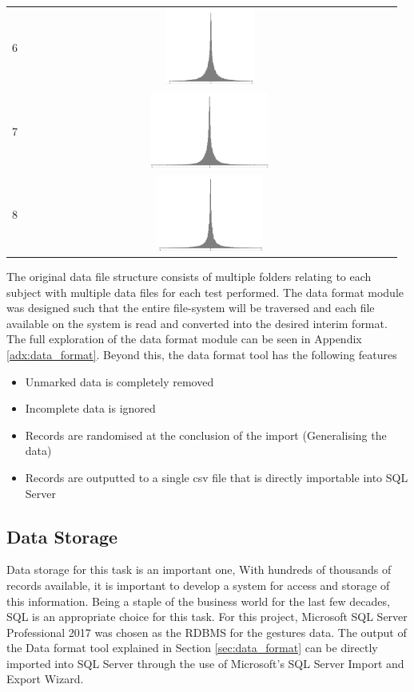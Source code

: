 \documentclass[11pt]{article}
\begin{document}
\begin{table}[H]
\begin{tabular}{cc}
			6 & \includegraphics[height=2.5cm, width=12cm]{Figures/Stats/channel6}\\
			7 & \includegraphics[height=2.5cm, width=12cm]{Figures/Stats/channel7}\\
			8 & \includegraphics[height=2.5cm, width=12cm]{Figures/Stats/channel8}\\
			\bottomrule
		\end{tabular}
	\end{table}

	\noindent
	The original data file structure consists of multiple folders relating to each subject with multiple data files for each test performed. The data format module was designed such that the entire file-system will be traversed and each file available on the system is read and converted into the desired interim format. The full exploration of the data format module can be seen in Appendix  \ref{adx:data_format}. Beyond this, the data format tool has the following features
	
	\begin{itemize}
		\item Unmarked data is completely removed
		\item Incomplete data is ignored
		\item Records are randomised at the conclusion of the import (Generalising the data)
		\item Records are outputted to a single csv file that is directly importable into SQL Server
	\end{itemize}

	\subsection{Data Storage}
	Data storage for this task is an important one, With hundreds of thousands of records available, it is important to develop a system for access and storage of this information. Being a staple of the business world for the last few decades, SQL is an appropriate choice for this task. For this project, Microsoft SQL Server Professional 2017 was chosen as the RDBMS for the gestures data. The output of the Data format tool explained in Section \ref{sec:data_format} can be directly imported into SQL Server through the use of Microsoft's SQL Server Import and Export Wizard. 
	
\end{document}
